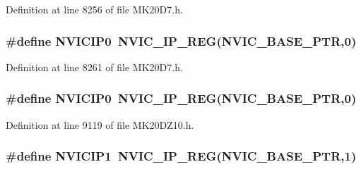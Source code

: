 Definition at line 8256 of file M\+K20\+D7.\+h.

\subsubsection[{\texorpdfstring{N\+V\+I\+C\+I\+P0}{NVICIP0}}]{\setlength{\rightskip}{0pt plus 5cm}\#define N\+V\+I\+C\+I\+P0~{\bf N\+V\+I\+C\+\_\+\+I\+P\+\_\+\+R\+EG}({\bf N\+V\+I\+C\+\_\+\+B\+A\+S\+E\+\_\+\+P\+TR},0)}\hypertarget{group___n_v_i_c___register___accessor___macros_gaf3fe8078a31238c740a06585d3cebcf9}{}\label{group___n_v_i_c___register___accessor___macros_gaf3fe8078a31238c740a06585d3cebcf9}


Definition at line 8261 of file M\+K20\+D7.\+h.

\subsubsection[{\texorpdfstring{N\+V\+I\+C\+I\+P0}{NVICIP0}}]{\setlength{\rightskip}{0pt plus 5cm}\#define N\+V\+I\+C\+I\+P0~{\bf N\+V\+I\+C\+\_\+\+I\+P\+\_\+\+R\+EG}({\bf N\+V\+I\+C\+\_\+\+B\+A\+S\+E\+\_\+\+P\+TR},0)}\hypertarget{group___n_v_i_c___register___accessor___macros_gaf3fe8078a31238c740a06585d3cebcf9}{}\label{group___n_v_i_c___register___accessor___macros_gaf3fe8078a31238c740a06585d3cebcf9}


Definition at line 9119 of file M\+K20\+D\+Z10.\+h.

\subsubsection[{\texorpdfstring{N\+V\+I\+C\+I\+P1}{NVICIP1}}]{\setlength{\rightskip}{0pt plus 5cm}\#define N\+V\+I\+C\+I\+P1~{\bf N\+V\+I\+C\+\_\+\+I\+P\+\_\+\+R\+EG}({\bf N\+V\+I\+C\+\_\+\+B\+A\+S\+E\+\_\+\+P\+TR},1)}\hypertarget{group___n_v_i_c___register___accessor___macros_ga89b9108995b1c16f426a9ff18f3556cf}{}\label{group___n_v_i_c___register___accessor___macros_ga89b9108995b1c16f426a9ff18f3556cf}


